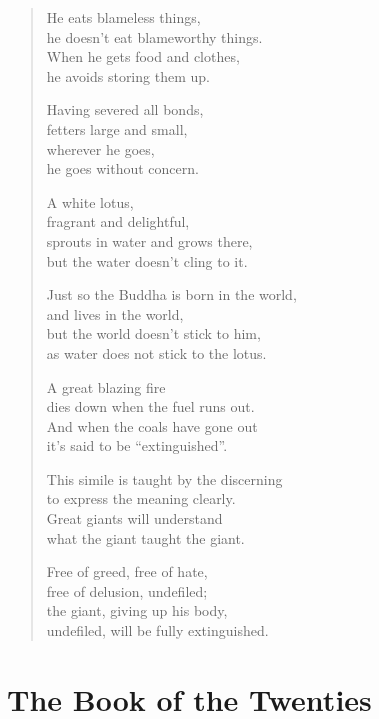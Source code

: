 \documentclass[12pt,openany]{book}%
\let\oldcontentsline\contentsline
\newcommand{\nopagecontentsline}[3]{\oldcontentsline{#1}{#2}{}}
\begin{document}
\begin{verse}
He eats blameless things, \\
he doesn’t eat blameworthy things. \\
When he gets food and clothes, \\
he avoids storing them up. 

Having severed all bonds, \\
fetters large and small, \\
wherever he goes, \\
he goes without concern. 

A white lotus, \\
fragrant and delightful, \\
sprouts in water and grows there, \\
but the water doesn’t cling to it. 

Just so the Buddha is born in the world, \\
and lives in the world, \\
but the world doesn’t stick to him, \\
as water does not stick to the lotus. 

A great blazing fire \\
dies down when the fuel runs out. \\
And when the coals have gone out \\
it’s said to be “extinguished”. 

This simile is taught by the discerning \\
to express the meaning clearly. \\
Great giants will understand \\
what the giant taught the giant. 

Free of greed, free of hate, \\
free of delusion, undefiled; \\
the giant, giving up his body, \\
undefiled, will be fully extinguished. 

%
\end{verse}

%
\part*{The Book of the Twenties}
\markboth{}{}
\addtocontents{toc}{\let\protect\contentsline\protect\oldcontentsline}
\end{document}
